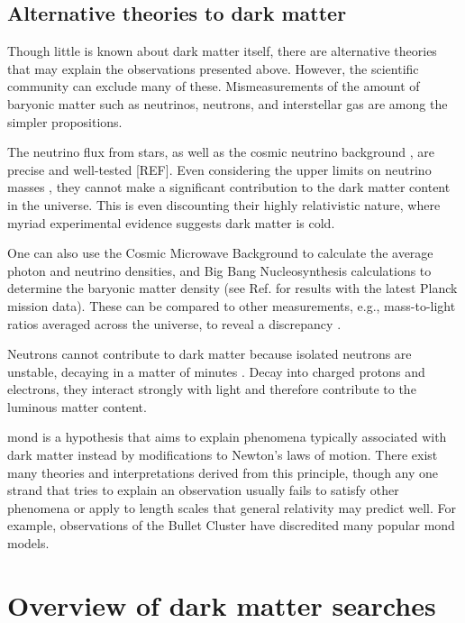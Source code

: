 \subsection{Alternative theories to dark matter}
\label{subsec:intro_alternative_dm_theories}

Though little is known about dark matter itself, there are alternative theories that may explain the observations presented above. However, the scientific community can exclude many of these. Mismeasurements of the amount of baryonic matter such as neutrinos, neutrons, and interstellar gas are among the simpler propositions.

The neutrino flux from stars, as well as the cosmic neutrino background \cite{weinberg2008cosmology}, are precise and well-tested [REF]. Even considering the upper limits on neutrino masses \cite{1742-6596-718-2-022013}, they cannot make a significant contribution to the dark matter content in the universe. This is even discounting their highly relativistic nature, where myriad experimental evidence suggests dark matter is cold.

One can also use the Cosmic Microwave Background to calculate the average photon and neutrino densities, and Big Bang Nucleosynthesis calculations to determine the baryonic matter density (see Ref. \cite{Fields:2019pfx} for results with the latest Planck mission data). These can be compared to other measurements, e.g., mass-to-light ratios averaged across the universe, to reveal a discrepancy \cite{cox2016universal}.

Neutrons cannot contribute to dark matter because isolated neutrons are unstable, decaying in a matter of minutes \cite{PDGbooklet2010}. Decay into charged protons and electrons, they interact strongly with light and therefore contribute to the luminous matter content.

\Gls{mond} is a hypothesis that aims to explain phenomena typically associated with dark matter instead by modifications to Newton's laws of motion. There exist many theories and interpretations derived from this principle, though any one strand that tries to explain an observation usually fails to satisfy other phenomena or apply to length scales that general relativity may predict well. For example, observations of the Bullet Cluster \cite{BulletClusterDMevidence} have discredited many popular \acrshort{mond} models.


\section{Overview of dark matter searches}
\label{subsec:intro_dm_searches}

